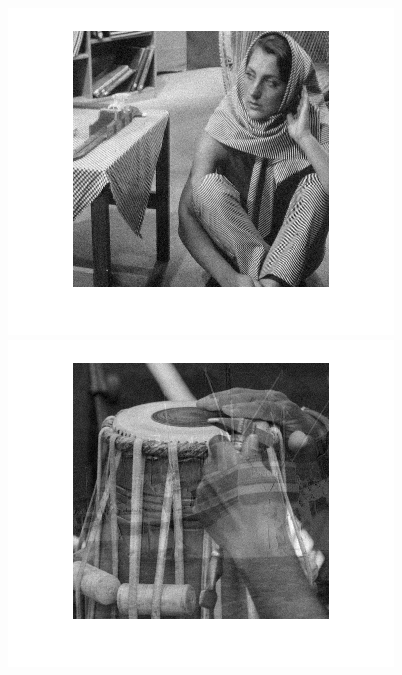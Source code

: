 \begin{figure}
{\begin{minipage}[b]{0.23\linewidth}
\includegraphics[width=1\linewidth]{images/jade_out3.png}\vspace{4pt}
\includegraphics[width=1\linewidth]{images/jade_out4.png}
\end{minipage}}
\end{figure}
